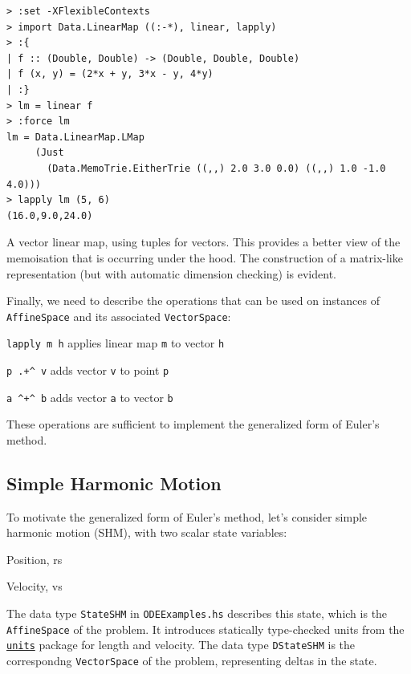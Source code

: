 \documentclass[12pt,openany]{book}
\newcommand{\filename}[1]{\texttt{#1}}  %
\newcommand{\code}[1]{\texttt{#1}}      %
\newcommand{\hspackage}[1]{\href{http://hackage.haskell.org/package/#1}{\texttt{#1}}}
\begin{document}
\begin{listing}[htbp]
\begin{verbatim}
> :set -XFlexibleContexts
> import Data.LinearMap ((:-*), linear, lapply)
> :{
| f :: (Double, Double) -> (Double, Double, Double)
| f (x, y) = (2*x + y, 3*x - y, 4*y)
| :}
> lm = linear f
> :force lm
lm = Data.LinearMap.LMap
     (Just
       (Data.MemoTrie.EitherTrie ((,,) 2.0 3.0 0.0) ((,,) 1.0 -1.0 4.0)))
> lapply lm (5, 6)
(16.0,9.0,24.0)
\end{verbatim}
\caption{A vector linear map, using tuples for vectors. This provides a better view of the memoisation that is occurring under the hood. The construction of a matrix-like representation (but with automatic dimension checking) is evident.}
\label{lst:linear-map-vector}
\end{listing}

Finally, we need to describe the operations that can be used on instances of \code{AffineSpace} and its associated \code{VectorSpace}:
\begin{pardescription}[leftmargin=6em,style=nextline]
\item [\code{lapply m h}] applies linear map \code{m} to vector \code{h}
\item [\code{p .+\^{} v}] adds vector \code{v} to point \code{p}
\item [\code{a \^{}+\^{} b}] adds vector \code{a} to vector \code{b}
\end{pardescription}
These operations are sufficient to implement the generalized form of Euler's method.

\subsection{Simple Harmonic Motion}

To motivate the generalized form of Euler's method, let's consider simple harmonic motion (SHM), with two scalar state variables:
\begin{paritemize}
\item Position, \gls{rs}
\item Velocity, \gls{vs}
\end{paritemize}
The data type \code{StateSHM} in \filename{ODEExamples.hs} describes this state, which is the \code{AffineSpace} of the problem. It introduces statically type-checked units from the \hspackage{units} package for length and velocity. The data type \code{DStateSHM} is the correspondng \code{VectorSpace} of the problem, representing deltas in the state.
\end{document}
